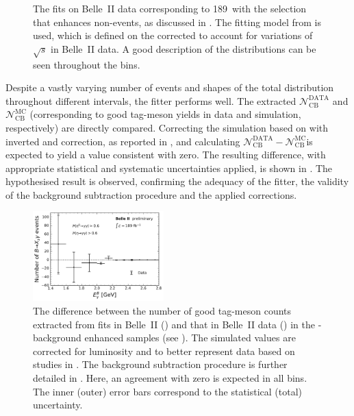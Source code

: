 \begin{figure}[hbtp!]
{    }
    \caption{\label{fig:mbc_bbar_ehnhanced_fits_data}
    The fits on Belle~II data corresponding to 189~\invfb with the selection 
    that enhances non-\BtoXsgamma events, as discussed in .
    The fitting model from  is used,
    which is defined on the corrected \Mbc to account for variations of $\sqrt{s}$ in Belle~II data.
    A good description of the \Mbc distributions can be seen throughout the \EB bins.
    }
\end{figure}

Despite a vastly varying number of events and shapes of the total distribution throughout different \EB intervals,
the fitter performs well.
The extracted $\mathcal{N}_{\mathrm{CB}}^{\mathrm{DATA}}$ and $\mathcal{N}_{\mathrm{CB}}^{\mathrm{MC}}$ (corresponding to good tag-\B meson yields in data and simulation, respectively)
are directly compared.
Correcting the simulation based on  with inverted \piVeto and \etaVeto correction, as reported in , and calculating $\mathcal{N}_{\mathrm{CB}}^{\mathrm{DATA}} - \mathcal{N}_{\mathrm{CB}}^{\mathrm{MC}}$is expected to yield a value consistent with zero.
The resulting difference, with appropriate statistical and systematic uncertainties applied, is shown in .
The hypothesised result is observed, confirming the adequacy of the fitter, the validity of the background subtraction procedure and the applied corrections.

\begin{figure}[hbtp!]
    \centering
    \includegraphics[width=0.45\textwidth]{figures/data_validation/bbar_enhanced_event_counts.pdf}
    \caption{\label{fig:bbar_enhanced_background_subtraction}
    The difference between the number of good tag-\B meson counts extracted from fits in Belle~II \MC () and that in Belle~II data () in the \BB-background enhanced samples (see ).
    The simulated values are corrected for luminosity and to better represent data based on studies in .
    The background subtraction procedure is further detailed in .
    Here, an agreement with zero is expected in all \EB bins.
    The inner (outer) error bars correspond to the statistical (total) uncertainty.
    }
\end{figure}

